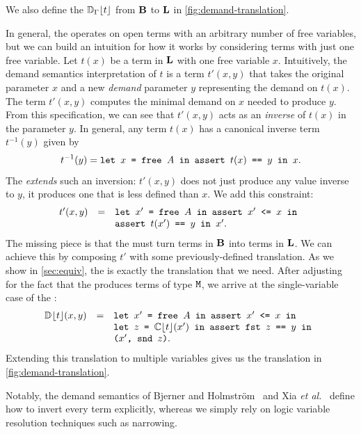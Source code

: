 We also define the \transDname{} \(\mathbb{D}_{\Gamma}\lfloor t\rfloor\) from \(\mathbf{B}\) to \(\mathbf{L}\)
in \cref{fig:demand-translation}.

In general, the \transDname{} operates on open terms with an arbitrary number of
free variables, but we can build an intuition for how it works by considering
terms with just one free variable. Let \(t(x)\) be a term in \(\mathbf{L}\) with one
free variable \(x\). Intuitively, the demand semantics interpretation of \(t\)
is a term \(t'(x, y)\) that takes the original parameter \(x\) and a new
\emph{demand} parameter \(y\) representing the demand on \(t(x)\). The term
\(t'(x, y)\) computes the minimal demand on \(x\) needed to produce \(y\). From
this specification, we can see that \(t'(x, y)\) acts as an \emph{inverse} of
\(t(x)\) in the parameter \(y\). In general, any term \(t(x)\) has a canonical
inverse term \(t^{-1}(y)\) given by
\[
  t^{-1}(y) = \texttt{\texttt{let}\ \({x}\)\ =\ \({\texttt{\texttt{free}\ \(A\)}}\)\ in\ \({\texttt{\texttt{assert}\ \(\texttt{\(t(x)\)\ \texttt{==}\ \(y\)}\)\ in \(x\)}}\)} .
\]
The \transDname{} \emph{extends} such an inversion: \(t'(x, y)\) does not just
produce any value inverse to \(y\), it produces one that is less defined than
\(x\). We add this constraint:
\[
  \begin{array}{rcl}
    t'(x, y) & = & \texttt{\texttt{let}\ \({x'}\)\ =\ \({\texttt{\texttt{free}\ \(A\)}}\)\ in\ \({\texttt{\texttt{assert}\ \(\texttt{\(x'\)\ \texttt{<=}\ \(x\)}\)\ in \(\relax\)}}\)} \\
             &   & \texttt{\texttt{assert}\ \(\texttt{\(t(x')\)\ \texttt{==}\ \(y\)}\)\ in \(x'\)} .
  \end{array}
\]
The missing piece is that the \transDname{} must turn terms in \(\mathbf{B}\) into
terms in \(\mathbf{L}\). We can achieve this by composing \(t'\) with some
previously-defined translation. As we show in \cref{sec:equiv}, the
\transCname{} is exactly the translation that we need. After adjusting for the
fact that the \transCname{} produces terms of type \(\texttt{M}\), we arrive at the
single-variable case of the \transDname{}:
\[
  \begin{array}{rcl}
    \mathbb{D}_{\relax}\lfloor t\rfloor(x, y) & = & \texttt{\texttt{let}\ \({x'}\)\ =\ \({\texttt{\texttt{free}\ \(A\)}}\)\ in\ \({\texttt{\texttt{assert}\ \(\texttt{\(x'\)\ \texttt{<=}\ \(x\)}\)\ in \(\relax\)}}\)} \\
                             &   & \texttt{\texttt{let}\ \({z}\)\ =\ \({\mathbb{C}\lfloor t\rfloor(x')}\)\ in\ \({\texttt{\texttt{assert}\ \(\texttt{\(\texttt{fst\ \(z\)}\)\ \texttt{==}\ \(y\)}\)\ in \(\relax\)}}\)} \\
                             &   & \texttt{(\(x'\),\ \(\texttt{snd\ \(z\)}\))} .
  \end{array}
\]
Extending this translation to multiple variables gives us the translation in
\cref{fig:demand-translation}.

Notably, the demand semantics of Bjerner and Holmstr{\"{o}}m~\cite{bjerner1989}
and Xia \emph{et al.}~\cite{demand-semantics} define how to invert every term
explicitly, whereas we simply rely on logic variable resolution techniques such
as narrowing.

